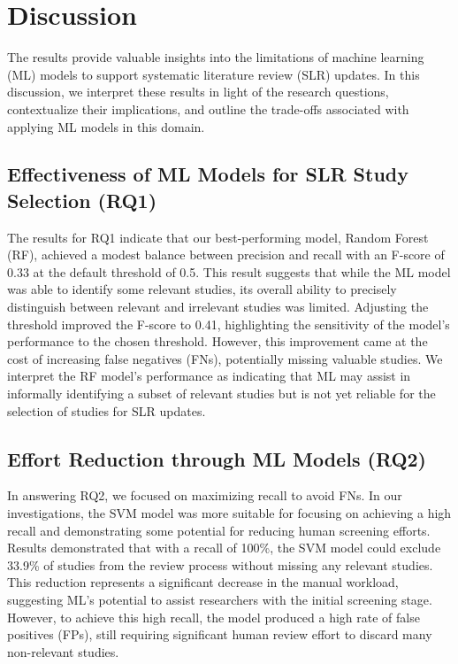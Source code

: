\section{Discussion}
\label{sec:discussion}

The results provide valuable insights into the limitations of machine learning (ML) models to support systematic literature review (SLR) updates. In this discussion, we interpret these results in light of the research questions, contextualize their implications, and outline the trade-offs associated with applying ML models in this domain.

\subsection{Effectiveness of ML Models for SLR Study Selection (RQ1)}

The results for RQ1 indicate that our best-performing model, Random Forest (RF), achieved a modest balance between precision and recall with an F-score of 0.33 at the default threshold of 0.5. This result suggests that while the ML model was able to identify some relevant studies, its overall ability to precisely distinguish between relevant and irrelevant studies was limited. Adjusting the threshold improved the F-score to 0.41, highlighting the sensitivity of the model’s performance to the chosen threshold. However, this improvement came at the cost of increasing false negatives (FNs), potentially missing valuable studies. We interpret the RF model’s performance as indicating that ML may assist in informally identifying a subset of relevant studies but is not yet reliable for the selection of studies for SLR updates.

\subsection{Effort Reduction through ML Models (RQ2)}

In answering RQ2, we focused on maximizing recall to avoid FNs. In our investigations, the SVM model was more suitable for focusing on achieving a high recall and demonstrating some potential for reducing human screening efforts. Results demonstrated that with a recall of 100\%, the SVM model could exclude 33.9\% of studies from the review process without missing any relevant studies. This reduction represents a significant decrease in the manual workload, suggesting ML’s potential to assist researchers with the initial screening stage. However, to achieve this high recall, the model produced a high rate of false positives (FPs), still requiring significant human review effort to discard many non-relevant studies.

